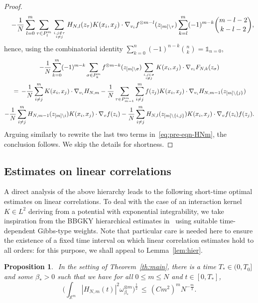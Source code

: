 \documentclass[a4paper,11pt,reqno,noindent]{amsart}
\theoremstyle{plain}
\newtheorem{prop}[theor]{Proposition}
\theoremstyle{definition}
\numberwithin{equation}{section}
\newcommand{\Xd}{\mathbb X}
\begin{document}
\begin{proof}
\begin{eqnarray*}
&&-\frac1N\sum_{l=0}^m\sum_{\tau\in P^m_l}\sum_{i,j\notin\tau\atop i\ne j}H_{N,l}(z_\tau)K(x_i,x_j)\cdot\nabla_{v_i}f^{\otimes m-l}(z_{[m]\setminus\tau})\sum_{k=l}^m(-1)^{m-k}\binom{m-l-2}{k-l-2},
\end{eqnarray*}
hence, using the combinatorial identity $\sum_{k=0}^n(-1)^{n-k}\binom{n}{k}=\mathds1_{n=0}$,
\begin{multline*}
-\frac1N\sum_{k=0}^m(-1)^{m-k}\sum_{\sigma\in P^m_k}f^{\otimes m-k}(z_{[m]\setminus\sigma})\sum_{i,j\in\sigma\atop i\ne j}K(x_i,x_j)\cdot\nabla_{v_i}F_{N,k}(z_\sigma)\\
\,=\,-\frac1N\sum_{i\ne j}^mK(x_i,x_j)\cdot\nabla_{v_i}H_{N,m}
-\frac1N\sum_{\tau\in P^m_{m-1}}\sum_{i\ne j}^mf(z_j)K(x_i,x_j)\cdot\nabla_{v_i}H_{N,m-1}(z_{[m]\setminus\{j\}})\\
-\frac1N\sum_{i\ne j}^mH_{N,m-1}(z_{[m]\setminus i})K(x_i,x_j)\cdot\nabla_{v}f(z_i)
-\frac1N\sum_{i\ne j}^mH_{N,l}(z_{[m]\setminus\{i,j\}})K(x_i,x_j)\cdot\nabla_{v}f(z_i)f(z_j).
\end{multline*}
Arguing similarly to rewrite the last two terms in~\eqref{eq:pre-eqn-HNm}, the conclusion follows. We skip the details for shortness.
\end{proof}

\subsection{Estimates on linear correlations}
A direct analysis of the above hierarchy leads to the following short-time optimal estimates on linear correlations. To deal with the case of an interaction kernel $K\in L^2$ deriving from a potential with exponential integrability, we take inspiration from the BBGKY hierarchical estimates in~\cite{BJS-22} using suitable time-dependent Gibbs-type weights. Note that particular care is needed here to ensure the existence of a fixed time interval on which linear correlation estimates hold to all orders: for this purpose, we shall appeal to Lemma~\ref{lem:hier}.

\begin{prop}\label{prop:HNm}$ $
In the setting of Theorem~\ref{th:main}, there is a time $T_*\in(0,T_0]$ and some $\beta_*>0$ such that we have for all $0\le m\le N$ and $t\in[0,T_*]$,
\[\Big(\int_{\Xd^m}|H_{N,m}(t)|^2\omega_{\beta_*}^{\otimes m}\Big)^\frac12\,\le\, (Cm^2)^mN^{-\frac m2}.\]
\end{prop}
\end{document}
